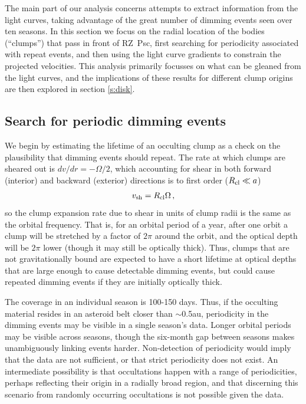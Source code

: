 \documentclass[useAMS,usenatbib,usegraphicx]{mn2e}
\begin{document}
The main part of our analysis concerns attempts to extract information from the light
curves, taking advantage of the great number of dimming events seen over ten seasons. In
this section we focus on the radial location of the bodies (``clumps'') that pass in
front of RZ~Psc, first searching for periodicity associated with repeat events, and then
using the light curve gradients to constrain the projected velocities. This analysis
primarily focusses on what can be gleaned from the light curves, and the implications of
these results for different clump origins are then explored in section \ref{s:disk}.

\subsection{Search for periodic dimming events}\label{ss:per}

We begin by estimating the lifetime of an occulting clump as a check on the plausibility
that dimming events should repeat. The rate at which clumps are sheared out is
$dv/dr = - \Omega/2$, which accounting for shear in both forward (interior) and backward
(exterior) directions is to first order ($R_{\rm cl} \ll a$)
\begin{equation}\label{eq:shear}
  v_{\rm sh} = R_{\rm cl} \Omega \, ,
\end{equation}
so the clump expansion rate due to shear in units of clump radii is the same as the
orbital frequency. That is, for an orbital period of a year, after one orbit a clump will
be stretched by a factor of $2\pi$ around the orbit, and the optical depth will be $2\pi$
lower (though it may still be optically thick). Thus, clumps that are not gravitationally
bound are expected to have a short lifetime at optical depths that are large enough to
cause detectable dimming events, but could cause repeated dimming events if they are
initially optically thick.

The coverage in an individual season is 100-150 days. Thus, if the occulting material
resides in an asteroid belt closer than $\sim$0.5au, periodicity in the dimming events
may be visible in a single season's data. Longer orbital periods may be visible across
seasons, though the six-month gap between seasons makes unambiguously linking events
harder. Non-detection of periodicity would imply that the data are not sufficient, or
that strict periodicity does not exist. An intermediate possibility is that occultations
happen with a range of periodicities, perhaps reflecting their origin in a radially broad
region, and that discerning this scenario from randomly occurring occultations is not
possible given the data.
\end{document}
